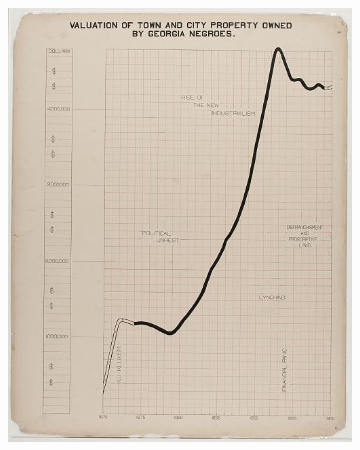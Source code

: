 \begin{figure}[H]
\begin{subfigure}{.24\textwidth}
        \includegraphics[width=1\textwidth]{figures/intro/du_bois_line.png}
        \caption{}
        \label{fig:intro_dpb}
    \end{subfigure}
    \begin{subfigure}{.24\textwidth}

\end{subfigure}
\end{figure}
